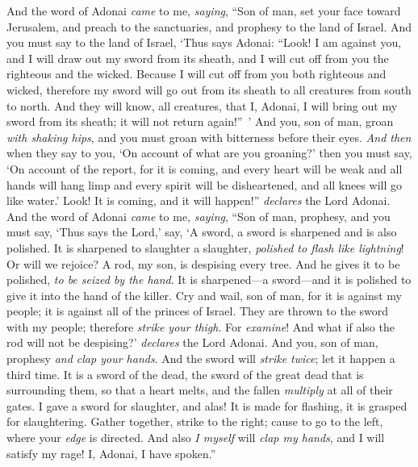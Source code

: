 \begin{biblechapter} %
 And the word of Adonai \textit{came} to me, \textit{saying},
\verse “Son of man, set your face toward Jerusalem, and preach to the sanctuaries, and prophesy to the land of Israel.
\verse And you must say to the land of Israel, ‘Thus says Adonai: “Look! I am against you, and I will draw out my sword from its sheath, and I will cut off from you the righteous and the wicked.
\verse Because I will cut off from you both righteous and wicked, therefore my sword will go out from its sheath to all creatures from south to north.
\verse And they will know, all creatures, that I, Adonai, I will bring out my sword from its sheath; it will not return again!” ’
\verse And you, son of man, groan \textit{with shaking hips}, and you must groan with bitterness before their eyes.
\verse \textit{And then} when they say to you, ‘On account of what are you groaning?’ then you must say, ‘On account of the report, for it is coming, and every heart will be weak and all hands will hang limp and every spirit will be disheartened, and all knees will go like water.’ Look! It is coming, and it will happen!” \textit{declares} the Lord Adonai.
\verse And the word of Adonai \textit{came} to me, \textit{saying},
\verse “Son of man, prophesy, and you must say, ‘Thus says the Lord,’ say, ‘A sword, a sword is sharpened and is also polished.
\verse It is sharpened to slaughter a slaughter, \textit{polished to flash like lightning}! Or will we rejoice? A rod, my son, is despising every tree.
\verse And he gives it to be polished, \textit{to be seized by the hand}. It is sharpened—a sword—and it is polished to give it into the hand of the killer.
\verse Cry and wail, son of man, for it is against my people; it is against all of the princes of Israel. They are thrown to the sword with my people; therefore \textit{strike your thigh}.
\verse For \textit{examine}! And what if also the rod will not be despising?’ \textit{declares} the Lord Adonai.
\verse And you, son of man, prophesy \textit{and clap your hands}. And the sword will \textit{strike twice}; let it happen a third time. It is a sword of the dead, the sword of the great dead that is surrounding them,
\verse so that a heart melts, and the fallen \textit{multiply} at all of their gates. I gave a sword for slaughter, and alas! It is made for flashing, it is grasped for slaughtering.
\verse Gather together, strike to the right; cause to go to the left, where your \textit{edge} is directed.
\verse And also \textit{I myself} will \textit{clap my hands}, and I will satisfy my rage! I, Adonai, I have spoken.”

\end{biblechapter}
